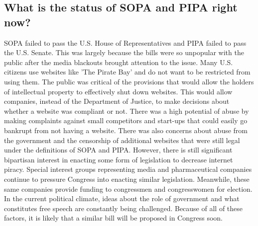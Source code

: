 \documentclass[11pt,journal,compsoc]{IEEEtran}
\begin{document}
\subsection{What is the status of SOPA and PIPA right now?}
SOPA failed to pass the U.S. House of Representatives and PIPA failed to pass the U.S. Senate. This was largely because the bills were so unpopular with the public after the media blackouts brought attention to the issue. Many U.S. citizens use websites like 'The Pirate Bay' and do not want to be restricted from using them. The public was critical of the provisions that would allow the holders of intellectual property to effectively shut down websites. This would allow companies, instead of the Department of Justice, to make decisions about whether a website was compliant or not. There was a high potential of abuse by making complaints against small competitors and start-ups that could easily go bankrupt from not having a website. There was also concerns about abuse from the government and the censorship of additional websites that were still legal under the definitions of SOPA and PIPA.
\indent However, there is still significant bipartisan interest in enacting some form of legislation to decrease internet piracy. Special interest groups representing media and pharmaceutical companies continue to pressure Congress into enacting similar legislation. Meanwhile, these same companies provide funding to congressmen and congresswomen for election. In the current political climate, ideas about the role of government and what constitutes free speech are constantly being challenged. Because of all of these factors, it is likely that a similar bill will be proposed in Congress soon. 
\end{document}
